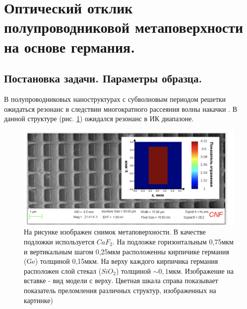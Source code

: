 \section{Оптический отклик полупроводниковой метаповерхности на основе германия.}

\subsection{Постановка задачи. Параметры образца.}
В полупроводниковых наноструктурах с субволновым периодом решетки ожидаться резонанс в следствии многократного рассеяния  волны накачки \cite{mftiOpt}. В данной структуре (рис. \ref{base1}) ожидался резонанс в ИК диапазоне.

\begin{figure}[h]
	\centering
    \includegraphics[width=0.8\linewidth]{images/base1.png}
	\caption{На рисунке изображен снимок метаповерхности. В качестве подложки используется $CaF_2$. На подложке  горизонтальным  0,75мкм и вертикальным шагом 0,25мкм расположенны кирпичике германия (Ge) толщиной 0,15мкм. На верху каждого кирпичика германия расположен слой стекал ($SiO_2$) толщиной $\sim 0,1$мкм. Изображение на вставке - вид модели с верху. Цветная шкала справа показывает показатель преломления различных структур, изображенных на картинке)}
	\label{base1}
\end{figure}

